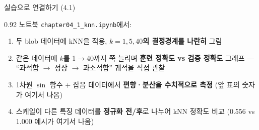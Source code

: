 \begin{frame}{실습으로 연결하기 (4.1)}
\begin{center}\begin{varwidth}{0.92\textwidth}
  노트북 \texttt{chapter04\_1\_knn.ipynb}에서:
  \begin{enumerate}
    \item 두 blob 데이터에 kNN을 적용,
      \textbf{$k=1, 5, 40$의 결정경계를 나란히} 그림
    \item 같은 데이터에 $k$를 1$\to$40까지 쭉 늘리며
      \textbf{훈련 정확도 vs 검증 정확도} 그래프 ---
      ``과적합 $\to$ 정상 $\to$ 과소적합'' 궤적을 직접 관찰
    \item 1차원 $\sin$ 함수 + 잡음 데이터에서
      \textbf{편향·분산을 수치적으로 측정}
      (앞 표의 숫자가 여기서 나옴)
    \item 스케일이 다른 특징 데이터를
      \textbf{정규화 전/후}로 나누어 kNN 정확도 비교
      (0.556 vs 1.000 예시가 여기서 나옴)
  \end{enumerate}
\end{varwidth}\end{center}
\end{frame}
